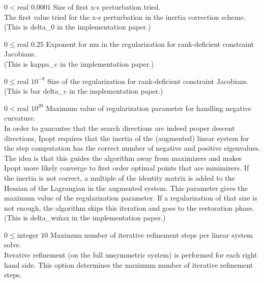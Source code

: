 %
{$0<\textrm{real}$}%
{$0.0001$}%
{Size of first x-s perturbation tried.\\
The first value tried for the x-s perturbation in the inertia correction scheme.(This is delta\_0 in the implementation paper.)}%
{}

%
{$0\leq\textrm{real}$}%
{$0.25$}%
{Exponent for mu in the regularization for rank-deficient constraint Jacobians.\\
(This is kappa\_c in the implementation paper.)}%
{}

%
{$0\leq\textrm{real}$}%
{$10^{- 8}$}%
{Size of the regularization for rank-deficient constraint Jacobians.\\
(This is bar delta\_c in the implementation paper.)}%
{}

%
{$0<\textrm{real}$}%
{$10^{ 20}$}%
{Maximum value of regularization parameter for handling negative curvature.\\
In order to guarantee that the search directions are indeed proper descent directions, Ipopt requires that the inertia of the (augmented) linear system for the step computation has the correct number of negative and positive eigenvalues. The idea is that this guides the algorithm away from maximizers and makes Ipopt more likely converge to first order optimal points that are minimizers. If the inertia is not correct, a multiple of the identity matrix is added to the Hessian of the Lagrangian in the augmented system. This parameter gives the maximum value of the regularization parameter. If a regularization of that size is not enough, the algorithm skips this iteration and goes to the restoration phase. (This is delta\_w\^max in the implementation paper.)}%
{}

%
{$0\leq\textrm{integer}$}%
{$10$}%
{Maximum number of iterative refinement steps per linear system solve.\\
Iterative refinement (on the full unsymmetric system) is performed for each right hand side.  This option determines the maximum number of iterative refinement steps.}%
{}

